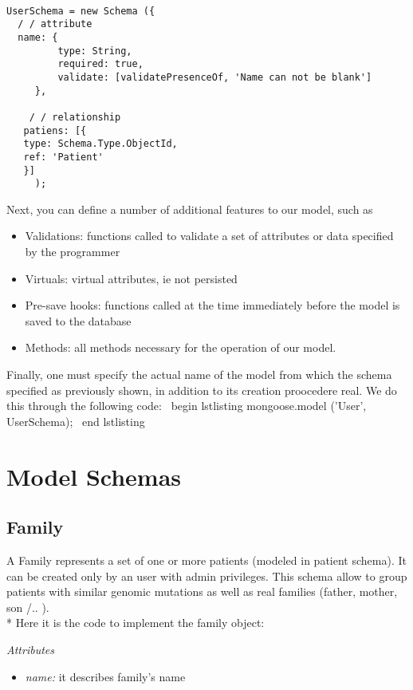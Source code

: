 \begin{lstlisting} 

UserSchema = new Schema ({
  / / attribute
  name: {
         type: String,
         required: true,
         validate: [validatePresenceOf, 'Name can not be blank']
     },

    / / relationship
   patiens: [{
   type: Schema.Type.ObjectId,
   ref: 'Patient'
   }]
     ); 
\end{lstlisting}

Next, you can define a number of additional features to our model, such as

\begin{itemize}
	\item Validations: functions called to validate a set of attributes or data specified by the programmer
	\item Virtuals: virtual attributes, ie not persisted
	\item Pre-save hooks: functions called at the time immediately before the model is saved to the 				database
	\item Methods: all methods necessary for the operation of our model. 
\end{itemize}

Finally, one must specify the actual name of the model from which the schema specified as previously shown, in addition to its creation proocedere real. We do this through the following code:
\ begin {lstlisting}
	mongoose.model ('User', UserSchema);
\ end {lstlisting}

\section{Model Schemas}

\subsection{Family}
A Family represents a set of one or more patients (modeled in patient schema). It can be created only by an user with admin privileges. This schema allow to group patients with similar genomic mutations as well as real families (father, mother, son /{..} ). \\*
Here it is the code to implement the family object: 



\emph{Attributes}   
\begin{itemize}
  \item \emph{name:} it describes family's name
\end{itemize}

